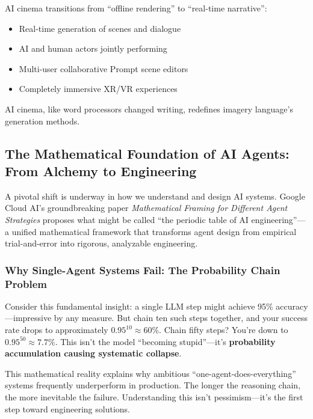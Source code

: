 AI cinema transitions from ``offline rendering'' to ``real-time narrative'':

\begin{itemize}
\item Real-time generation of scenes and dialogue
\item AI and human actors jointly performing
\item Multi-user collaborative Prompt scene editors
\item Completely immersive XR/VR experiences
\end{itemize}

AI cinema, like word processors changed writing, redefines imagery language's generation methods.

\subsection{The Mathematical Foundation of AI Agents: From Alchemy to Engineering}
\label{sec:agent-math-framework}

A pivotal shift is underway in how we understand and design AI systems. Google Cloud AI's groundbreaking paper \textit{Mathematical Framing for Different Agent Strategies} \citep{googlecloud2024agentmath} proposes what might be called ``the periodic table of AI engineering''—a unified mathematical framework that transforms agent design from empirical trial-and-error into rigorous, analyzable engineering.

\subsubsection{Why Single-Agent Systems Fail: The Probability Chain Problem}

Consider this fundamental insight: a single LLM step might achieve 95\% accuracy—impressive by any measure. But chain ten such steps together, and your success rate drops to approximately $0.95^{10} \approx 60\%$. Chain fifty steps? You're down to $0.95^{50} \approx 7.7\%$. This isn't the model ``becoming stupid''—it's \textbf{probability accumulation causing systematic collapse}.

This mathematical reality explains why ambitious ``one-agent-does-everything'' systems frequently underperform in production. The longer the reasoning chain, the more inevitable the failure. Understanding this isn't pessimism—it's the first step toward engineering solutions.


